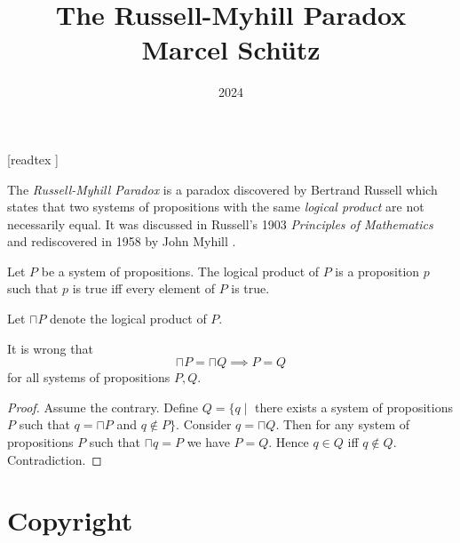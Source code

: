 \documentclass{article}
\title{The Russell-Myhill Paradox\\[0.5em]Marcel Schütz}
\date{2024}
\begin{document}
  \maketitle

  \begin{imports}
    \begin{forthel}
      [readtex ]
    \end{forthel}
  \end{imports}

  \noindent The \emph{Russell-Myhill Paradox} is a paradox discovered by 
  Bertrand Russell which states that two systems of propositions with the same 
  \emph{logical product} are not necessarily equal.
  It was discussed in Russell's 1903 \emph{Principles of Mathematics}
  \cite[Appendix B]{Russell1903} and rediscovered in 1958 by John Myhill
  \cite{Myhill1958}.

  \begin{forthel}
    \begin{signature*}
      Let $P$ be a system of propositions.
      The logical product of $P$ is a proposition $p$ such that $p$ is true iff every element of $P$ is true.
    \end{signature*}
    
    Let $\sqcap P$ denote the logical product of $P$.
    
    \begin{theorem*}\label{russell_myhill_paradox}
      It is wrong that
      \[ \sqcap P = \sqcap Q \implies P = Q \]
      for all systems of propositions $P, Q$.
    \end{theorem*}
    \begin{proof}
      Assume the contrary.
      Define $Q = \{q \mid$ there exists a system of propositions $P$ such that $q = \sqcap P$ and $q \notin P\}$.
      Consider $q = \sqcap Q$.
      Then for any system of propositions $P$ such that $\sqcap q = P$ we have $P = Q$.
      Hence $q \in Q$ iff $q \notin Q$.
      Contradiction.
    \end{proof}
  \end{forthel}

  \printbibliography

  \section*{Copyright}
  \doclicenseThis
\end{document}
